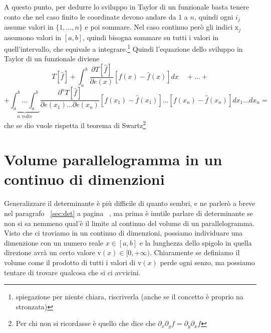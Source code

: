 \documentclass[11pt,a4paper]{report}
\newcommand{\vettorec}[1]{\textrm{#1}}
\theoremstyle{definition}
\theoremstyle{plain}
\theoremstyle{plain}
\begin{document}
			A questo punto, per dedurre lo sviluppo in Taylor di un funzionale basta tenere conto che nel caso finito le coordinate devono andare da $1$ a $n$, quindi ogni $i_j$ assume valori in $\{1,\dots,n\}$ e poi sommare.\newline
			Nel caso continuo però gli indici $\vettorec x_j$ assumono valori in $[a,b]$, quindi bisogna sommare su tutti i valori in quell'intervallo, che equivale a integrare.\footnote{spiegazione per niente chiara, riscriverla (anche se il concetto è proprio na stronzata)}\newline
			Quindi l'equazione dello sviluppo in Taylor di un funzionale diviene
			\begin{equation}
				T[\hat f]+\int_a^b \frac{\partial T[\hat f]}{\partial e(x)}[f(x)-\hat f(x)]dx\quad+\dots+
			\end{equation}
			\[
				+\underbrace{\int_a^b\dots\int_a^b}_{n\textrm{ volte}}
				\frac{\partial^n T[\hat f]}{\partial e(x_1)\dots\partial e(x_n)}[f(x_1)-\hat f(x_1)]\dots[f(x_n)-\hat f(x_n)]dx_1\dots dx_n=
			\]
			che se dio vuole rispetta il teorema di Swartz\footnote{Per chi non si ricordasse è quello che dice che $\partial_x\partial_y f=\partial_y\partial_x f$}




		\section{Volume parallelogramma in un continuo di dimenzioni}
			Generalizzare il determinante è più difficile di quanto sembri, e ne parlerò a breve nel paragrafo ~\ref{sec:det} a pagina ~\pageref{sec:det}, ma prima è inutile parlare di determinante se non si sa nemmeno qual'è il limite al continuo del volume di un parallelogramma.\newline
			Visto che ci troviamo in un continuo di dimenzioni, possiamo individuare una dimenzione con un numero reale $x\in[a,b]$ e la lunghezza dello spigolo in quella direzione avrà un certo valore $\vettorec v(x)\in[0,+\infty)$.\newline
			Chiaramente se definiamo il volume come il prodotto di tutti i valori di $\vettorec v(x)$ perde ogni senzo, ma possiamo tentare di trovare qualcosa che si ci avvicini.\newline
\end{document}
